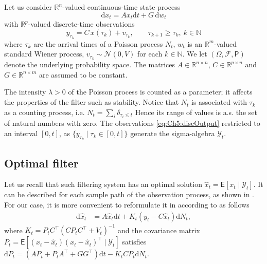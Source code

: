 \documentclass[12pt]{llncs}
\begin{document}
Let us consider $\mathbb{R}^n$-valued continuous-time state process
\begin{equation}\label{eq:Ch5:stateProc}
\mathrm{d} x_t = A x_t \mathrm{d} t + G \, \mathrm{d} w_t
\end{equation}
with $\mathbb{R}^p$-valued discrete-time observations
\begin{equation}\label{eq:Ch5:discOutput}
y_{\tau_{k}} = C \, x(\tau_{k}) + v_{\tau_k}, \qquad \tau_{k+1}\geq \tau_k, \ k\in\mathbb{N}
\end{equation}
where $\tau_k$ are the arrival times of a Poisson process $N_t$,  $w_t$ is an $\mathbb{R}^m$-valued standard Wiener process, $v_{\tau_k} \sim \mathcal{N}(0,V)$ for each $k \in \mathbb{N}$. We let $(\Omega,\mathcal{F}, \mathsf{P})$ denote the underlying probability space.  The matrices $A \in \mathbb{R}^{n\times n}$, $C \in \mathbb{R}^{p\times n}$ and $G \in \mathbb{R}^{n \times m}$ are assumed to be constant. 

The intensity $\lambda>0$ of the Poisson process is counted as a parameter; it affects the properties of the filter such as stability. Notice that $N_t$ is associated with $\tau_k$ as a counting process, i.e.
$
    N_t = \sum_i \delta_{\tau_i\leq t}
$
Hence its range of values is a.s. the set of natural numbers with zero.
The observations \eqref{eq:Ch5:discOutput} restricted to an interval $[0,t]$, as $\{y_{\tau_k} \mid \tau_k\in[0,t]\}$  generate the sigma-algebra $\mathcal{Y}_t$. 


\subsection{Optimal filter}


Let us recall that such filtering system has an optimal solution $\widehat x_t = \mathsf{E}[x_t \mid \mathcal{Y}_t]$. It can be described for each sample path of the observation process, as shown in \cite[Th. 7.1]{jazw}. For our case, it is more convenient to reformulate it in according to \cite[Th. 3.3]{yufer-transport} as follows 
\begin{align}
\label{eq:ch5: opt-x}
\mathrm{d} \widehat x_t  &= A \widehat x_t \mathrm{d} t + K_t(y_t - C \widehat x_{t})\mathrm{d} N_t, 
\end{align}
where $K_t = P_t C^\top (C P_t C^\top + V_t)^{-1}$ and the covariance matrix $P_t= \mathsf{E}[(x_t - \widehat x_t)(x_t - \widehat x_t)^\top \mid \mathcal{Y}_t]$ satisfies
$\mathrm{d} P_t = (A P_t + P_t A^\top + G G^\top) \mathrm{d} t  - K_t C P_t \mathrm{d} N_t. $%
\end{document}
